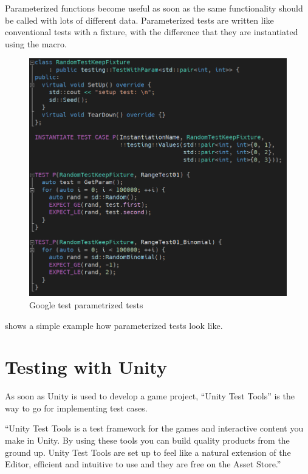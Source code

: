     Parameterized functions become useful as soon as the same functionality should be called with lots of different data.
    Parameterized tests are written like conventional tests with a fixture, with the difference that they are instantiated using the  macro.
    
    \begin{figure}[hbtp]
        \centering
        \includegraphics[width=\columnwidth]{img/gtestParam.PNG}
        \caption{Google test parametrized tests}
        \label{fig:gtestParam}
    \end{figure}

      shows a simple example how parameterized tests look like.


\section{Testing with Unity} \label{sec:Unity}
    As soon as Unity is used to develop a game project, ``Unity Test Tools'' is the way to go for implementing test cases.

    ``Unity Test Tools is a test framework for the games and interactive content you make in Unity. 
        By using these tools you can build quality products from the ground up. 
        Unity Test Tools are set up to feel like a natural extension of the Editor, 
        efficient and intuitive to use and they are free on the Asset Store.'' \cite[]{unity3d:TestToolsQA}

